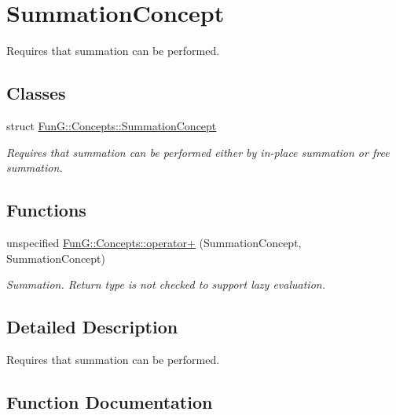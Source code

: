 \hypertarget{group__SummationConcept}{}\section{Summation\+Concept}
\label{group__SummationConcept}


Requires that summation can be performed.  


\subsection*{Classes}
\begin{DoxyCompactItemize}
\item 
struct \hyperlink{structFunG_1_1Concepts_1_1SummationConcept}{Fun\+G\+::\+Concepts\+::\+Summation\+Concept}
\begin{DoxyCompactList}\small\item\em Requires that summation can be performed either by in-\/place summation or free summation. \end{DoxyCompactList}\end{DoxyCompactItemize}
\subsection*{Functions}
\begin{DoxyCompactItemize}
\item 
unspecified \hyperlink{group__SummationConcept_gab9d1639ea6ed1088ec5bfbee24625f89}{Fun\+G\+::\+Concepts\+::operator+} (Summation\+Concept, Summation\+Concept)
\begin{DoxyCompactList}\small\item\em Summation. Return type is not checked to support lazy evaluation. \end{DoxyCompactList}\end{DoxyCompactItemize}


\subsection{Detailed Description}
Requires that summation can be performed. 



\subsection{Function Documentation}
\hypertarget{group__SummationConcept_gab9d1639ea6ed1088ec5bfbee24625f89}{}
